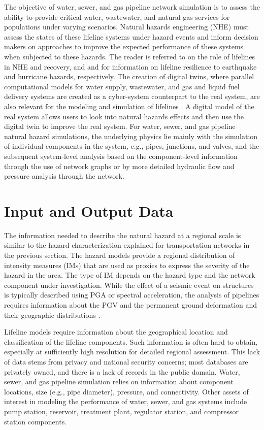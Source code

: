 The objective of water, sewer, and gas pipeline network simulation is to assess the ability to provide critical water, wastewater, and natural gas services for populations under varying scenarios. Natural hazards engineering (NHE) must assess the states of these lifeline systems under hazard events and inform decision makers on approaches to improve the expected performance of these systems when subjected to these hazards. The reader is referred to  \citet{johnson2016critical} on the role of lifelines in NHE and recovery, and \citet{orourke2014earthquakeresilient} and \citet{newyorkcitydep2013nyc} for information on lifeline resilience to earthquake and hurricane hazards, respectively. 
The creation of digital twins, where parallel computational models for water supply, wastewater, and gas and liquid fuel delivery systems are created as a cyber-system counterpart to the real system, are also relevant for the modeling and simulation of lifelines \citep{orourke2010geohazards, fan2019disaster}. A digital model of the real system allows users to look into natural hazards effects and then use the digital twin to improve the real system. For water, sewer, and gas pipeline natural hazard simulations, the underlying physics lie mainly with the simulation of individual components in the system, e.g., pipes, junctions, and valves, and the subsequent system-level analysis based on the component-level information through the use of network graphs or by more detailed hydraulic flow and pressure analysis through the network.
 
\section{Input and Output Data}
\label{sec:perf_pipeline_io}

The information needed to describe the natural hazard at a regional scale is similar to the hazard characterization explained for transportation networks in the previous section. The hazard models provide a regional distribution of intensity measures (IMs) that are used as proxies to express the severity of the hazard in the area. The type of IM depends on the hazard type and the network component under investigation. While the effect of a seismic event on structures is typically described using PGA or spectral acceleration, the analysis of pipelines requires information about the PGV and the permanent ground deformation and their geographic distributions \citep{romero2010seismic}.

Lifeline models require information about the geographical location and classification of the lifeline components. Such information is often hard to obtain, especially at sufficiently high resolution for detailed regional assessment. This lack of data stems from privacy and national security concerns; most databases are privately owned, and there is a lack of records in the public domain. Water, sewer, and gas pipeline simulation relies on information about component locations, size (e.g., pipe diameter), pressure, and connectivity. Other assets of interest in modeling the performance of water, sewer, and gas systems include pump station, reservoir, treatment plant, regulator station, and compressor station components.

